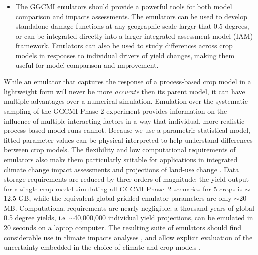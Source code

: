 \documentclass[gmdd]{copernicus} %
\begin{document}
\begin{itemize}
	\item The GGCMI emulators should provide a powerful tools for both model comparison and impacts assessments. The emulators can be used to develop standalone damage functions at any geographic scale larger that 0.5 degrees, or can be integrated directly into a larger integrated assessment model (IAM) framework. Emulators can also be used to study differences across crop models in responses to individual drivers of yield changes, making them useful for model comparison and improvement.


\end{itemize}

 
While an emulator that captures the response of a process-based crop model in a lightweight form  will never be more \textit{accurate} then its parent model, it can have multiple advantages over a numerical simulation. 
Emulation over the systematic sampling of the GGCMI Phase 2 experiment provides information on the influence of multiple interacting factors in a way that individual, more realistic process-based model runs cannot. 
Because we use a parametric statistical model, fitted parameter values can be physical interpreted to help understand differences between crop models. 
The flexibility and low computational requirements of emulators also make them particularly suitable for applications in integrated climate change impact assessments and projections of land-use change \citep[e.g.][]{nelson2014}.
Data storage requirements are reduced by three orders of magnitude: the yield output for a single crop model simulating all GGCMI Phase~2 scenarios for 5 crops is $\sim$12.5 GB, while the equivalent global gridded emulator parameters are only $\sim$20 MB. 
Computational requirements are nearly negligible: a thousand years of global 0.5 degree yields, i.e\ $\sim$40,000,000 individual yield projections, can be emulated in 20 seconds on a laptop computer. The resulting suite of emulators should find considerable use in climate impacts analyses \citep[e.g.][]{Stevanovic2016}, and allow  
explicit evaluation of the uncertainty embedded in the choice of climate and crop models \citep{muller_global_2017}. 
\end{document}
